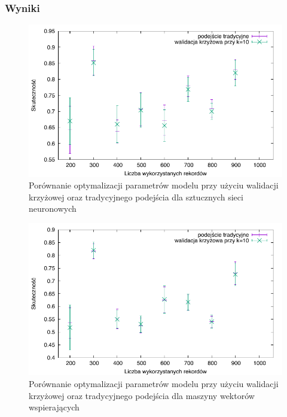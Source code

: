 \subsubsection{Wyniki}
\newcommand{\cvsize}{1}


\begin{figure}
\centering
\includegraphics[scale=\cvsize]{res/cv_ann.pdf}
\caption[Caption for LOF]{Porównanie optymalizacji parametrów modelu przy użyciu walidacji krzyżowej oraz tradycyjnego podejścia dla sztucznych sieci neuronowych\label{cv_ann}}
\end{figure}

\begin{figure}
\centering
\includegraphics[scale=\cvsize]{res/cv_svm.pdf}
\caption[Caption for LOF]{Porównanie optymalizacji parametrów modelu przy użyciu walidacji krzyżowej oraz tradycyjnego podejścia dla maszyny wektorów wspierających\label{cv_svm}}
\end{figure}

